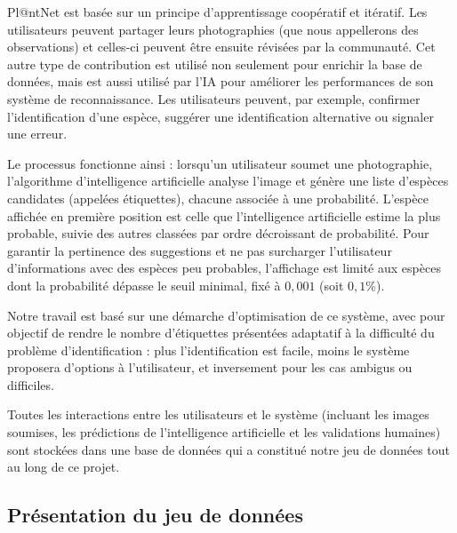 \documentclass[a4paper,12pt]{article}
\begin{document}
\vspace{0.2cm}

Pl@ntNet est basée sur un principe d’apprentissage coopératif et itératif. Les utilisateurs peuvent partager leurs photographies (que nous appellerons des observations) et celles-ci peuvent être ensuite révisées par la communauté. Cet autre type de contribution est utilisé non seulement pour enrichir la base de données, mais est aussi utilisé par l’IA pour améliorer les performances de son système de reconnaissance. Les utilisateurs peuvent, par exemple, confirmer l'identification d'une espèce, suggérer une identification alternative ou signaler une erreur.

\vspace{0.2cm}

Le processus fonctionne ainsi : lorsqu'un utilisateur soumet une photographie, l'algorithme d'intelligence artificielle analyse l'image et génère une liste d'espèces candidates (appelées étiquettes), chacune associée à une probabilité. L'espèce affichée en première position est celle que l'intelligence artificielle estime la plus probable, suivie des autres classées par ordre décroissant de probabilité. Pour garantir la pertinence des suggestions et ne pas surcharger l'utilisateur d'informations avec des espèces peu probables, l'affichage est limité aux espèces dont la probabilité dépasse le seuil minimal, fixé à $0,001$ (soit $0,1\%$).

\vspace{0.2cm}

Notre travail est basé sur une démarche d'optimisation de ce système, avec pour objectif de rendre le nombre d'étiquettes présentées adaptatif à la difficulté du problème d'identification : plus l'identification est facile, moins le système proposera d'options à l'utilisateur, et inversement pour les cas ambigus ou difficiles.

\vspace{0.2cm}

Toutes les interactions entre les utilisateurs et le système (incluant les images soumises, les prédictions de l'intelligence artificielle et les validations humaines) sont stockées dans une base de données qui a constitué notre jeu de données tout au long de ce projet.


\subsection{Présentation du jeu de données}
\end{document}
